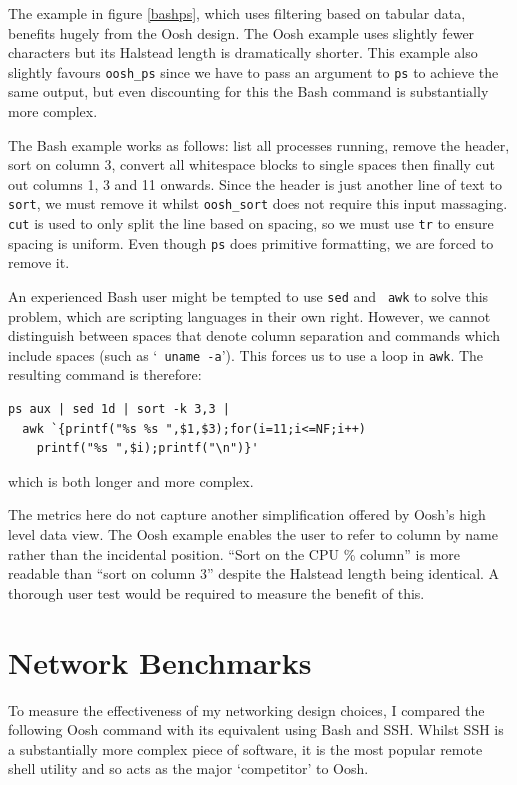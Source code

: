 \documentclass[12pt,twoside,notitlepage]{report}
\begin{document}
The example in figure \ref{bashps}, which uses filtering based on
tabular data, benefits hugely from the Oosh design. The Oosh example
uses slightly fewer characters but its Halstead length is dramatically
shorter. This example also slightly favours {\tt oosh\_ps} since we
have to pass an argument to {\tt ps} to achieve the same output, but
even discounting for this the Bash command is substantially more
complex.

The Bash example works as follows: list all processes running, remove
the header, sort on column 3, convert all whitespace blocks to single
spaces then finally cut out columns 1, 3 and 11 onwards. Since the
header is just another line of text to {\tt sort}, we must remove it
whilst {\tt oosh\_sort} does not require this input massaging. {\tt
  cut} is used to only split the line based on spacing, so we must use
{\tt tr} to ensure spacing is uniform. Even though {\tt ps} does
primitive formatting, we are forced to remove it.

An experienced Bash user might be tempted to use {\tt sed} and {\tt
awk} to solve this problem, which are scripting languages in their own
right. However, we cannot distinguish between spaces that denote
column separation and commands which include spaces (such as `{\tt
uname -a}'). This forces us to use a loop in {\tt awk}. The resulting
command is therefore:

\begin{verbatim}
ps aux | sed 1d | sort -k 3,3 |
  awk `{printf("%s %s ",$1,$3);for(i=11;i<=NF;i++) 
    printf("%s ",$i);printf("\n")}'
\end{verbatim}

\noindent
which is both longer and more complex.

The metrics here do not capture another simplification offered by Oosh's high
level data view. The Oosh example enables the user to refer to column by name
rather than the incidental position. ``Sort on the CPU \% column'' is more
readable than ``sort on column 3'' despite the Halstead length being
identical. A thorough user test would be required to measure the benefit of
this.


\section{Network Benchmarks}

To measure the effectiveness of my networking design choices, I
compared the following Oosh command with its equivalent using Bash and
SSH. Whilst SSH is a substantially more complex piece of software, it
is the most popular remote shell utility \cite{ssh} and so acts as the major
`competitor' to Oosh.
\end{document}
